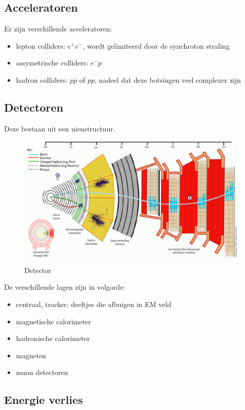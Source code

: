 \documentclass[../main.tex]{subfiles}
\begin{document}
\subsection{Acceleratoren}%
\label{sub:acceleratoren}

Er zijn verschillende acceleratoren: 
\begin{itemize}
    \item lepton colliders: $e^+e^-$, wordt gelimiteerd door de synchroton straling
    \item assymetrische colliders: $e^-p$
    \item hadron colliders: $p\overline p$ of $pp$, nadeel dat deze botsingen veel complexer zijn
\end{itemize}

\subsection{Detectoren}%
\label{sub:detectoren}

Deze bestaan uit een uienstructuur.

\begin{figure}[h]
    \centering
    \includegraphics[width=0.8\linewidth]{introduction_and_review/detector.png}
    \caption{Detector}%
    \label{fig:detector}
\end{figure}

De verschillende lagen zijn in volgorde:
\begin{itemize}
    \item centraal, tracker: deeltjes die afbuigen in EM veld
    \item magnetische calorimeter
    \item hadronische calorimeter
    \item magneten
    \item muon detectoren
\end{itemize}

\subsection{Energie verlies}%
\label{sub:energie_verlies}
\end{document}
